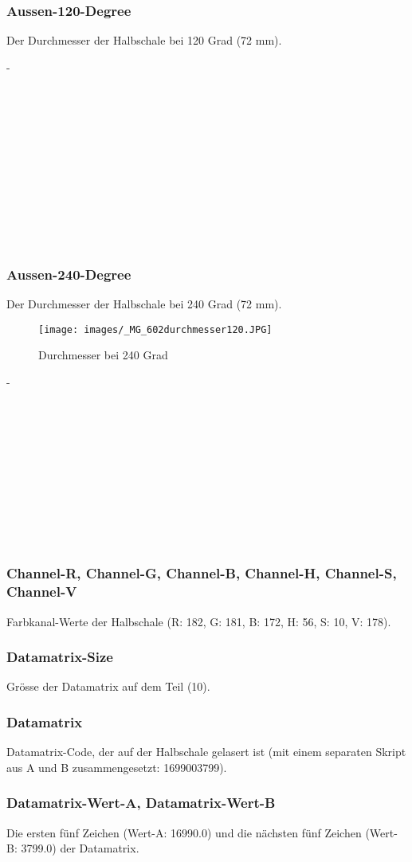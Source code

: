 \subsubsection*{Aussen-120-Degree}
Der Durchmesser der Halbschale bei 120 Grad (72 mm).


-\\
\\
\\
\\
\\
\\
\\
\\
\\
\\
\\
\\

\subsubsection*{Aussen-240-Degree}
Der Durchmesser der Halbschale bei 240 Grad (72 mm).

\begin{wrapfigure}{r}{0.3\textwidth}
\centering
\texttt{[image: images/\_MG\_602durchmesser120.JPG]}
\caption{Durchmesser bei 240 Grad}
\label{fig:Def240}
\end{wrapfigure}

-\\
\\
\\
\\
\\
\\
\\
\\
\\
\\
\\
\subsubsection*{Channel-R, Channel-G, Channel-B, Channel-H, Channel-S, Channel-V}
Farbkanal-Werte der Halbschale (R: 182, G: 181, B: 172, H: 56, S: 10, V: 178).

\subsubsection*{Datamatrix-Size}
Grösse der Datamatrix auf dem Teil (10).

\subsubsection*{Datamatrix}
Datamatrix-Code, der auf der Halbschale gelasert ist (mit einem separaten Skript aus A und B zusammengesetzt: 1699003799).

\subsubsection*{Datamatrix-Wert-A, Datamatrix-Wert-B}
Die ersten fünf Zeichen (Wert-A: 16990.0) und die nächsten fünf Zeichen (Wert-B: 3799.0) der Datamatrix.
